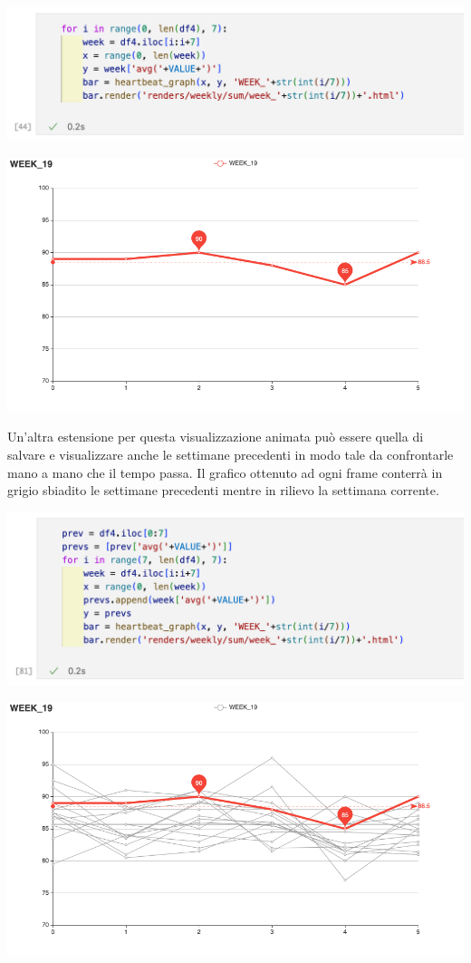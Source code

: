 \documentclass[11pt, oneside]{article}
\begin{document}
\begin{center}
\includegraphics[scale=0.45]{5_mk_gif_1.png}
\end{center}

\begin{center}
\includegraphics[scale=0.4]{5_hb.png}
\end{center}

Un'altra estensione per questa visualizzazione animata può essere quella di salvare e visualizzare anche le settimane precedenti in modo tale da confrontarle mano a mano che il tempo passa. Il grafico ottenuto ad ogni frame conterrà in grigio sbiadito le settimane precedenti mentre in rilievo la settimana corrente.

\begin{center}
\includegraphics[scale=0.45]{5_mk_gif_2.png}
\end{center}

\begin{center}
\includegraphics[scale=0.4]{5_hb_sum.png}
\end{center}
\end{document}
